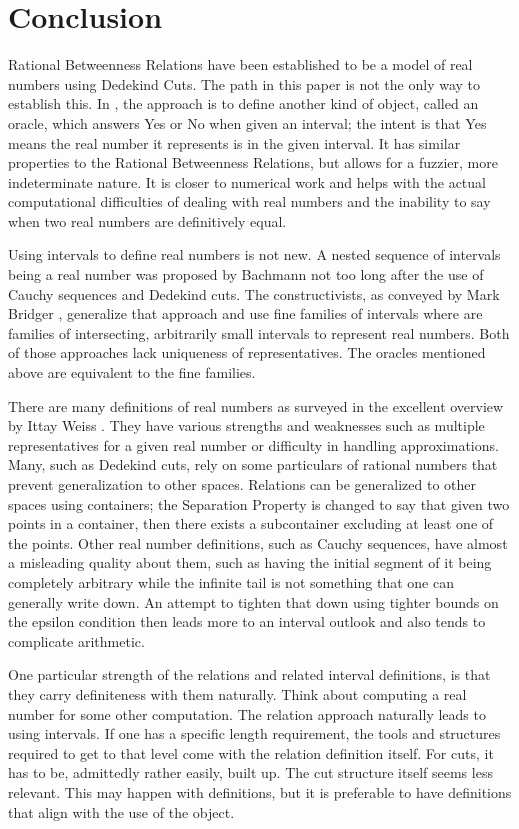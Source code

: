 \documentclass[12pt]{article}
\begin{document}
\section{Conclusion}

Rational Betweenness Relations have been established to be a model of real numbers using Dedekind Cuts. The path in this paper is not the only way to establish this. In \cite{taylor24oraclerbr}, the approach is to define another kind of object, called an oracle, which answers Yes or No when given an interval; the intent is that Yes means the real number it represents is in the given interval. It has similar properties to the Rational Betweenness Relations, but allows for a fuzzier, more indeterminate nature. It is closer to numerical work and helps with the actual computational difficulties of dealing with real numbers and the inability to say when two real numbers are definitively equal. 

Using intervals to define real numbers is not new.  A nested sequence of intervals being a real number was proposed by Bachmann not too long after the use of Cauchy sequences and Dedekind cuts. The constructivists, as conveyed by Mark Bridger \cite{bridger}, generalize that approach and use fine families of intervals where are families of intersecting, arbitrarily small intervals to represent real numbers. Both of those approaches lack uniqueness of representatives. The oracles mentioned above are equivalent to the fine families.

There are many definitions of real numbers as surveyed in the excellent overview by Ittay Weiss \cite{ittay-2015}. They have various strengths and weaknesses such as multiple representatives for a given real number or difficulty in handling approximations. Many, such as Dedekind cuts, rely on some particulars of rational numbers that prevent generalization to other spaces. Relations can be generalized to other spaces using containers; the Separation Property is changed to say that given two points in a container, then there exists a subcontainer excluding at least one of the points. Other real number definitions, such as Cauchy sequences, have almost a misleading quality about them, such as having the initial segment of it being completely arbitrary while the infinite tail is not something that one can generally write down. An attempt to tighten that down using tighter bounds on the epsilon condition then leads more to an interval outlook and also tends to complicate arithmetic. 

One particular strength of the relations and related interval definitions, is that they carry definiteness with them naturally. Think about computing a real number for some other computation. The relation approach naturally leads to using intervals. If one has a specific length requirement, the tools and structures required to get to that level come with the relation definition itself. For cuts, it has to be, admittedly rather easily, built up. The cut structure itself seems less relevant. This may happen with definitions, but it is preferable to have definitions that align with the use of the object. 
\end{document}
